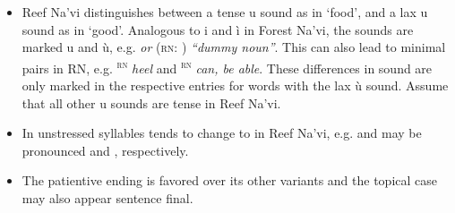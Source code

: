 \begin{itemize}
		\subitem When two ejectives across syllable boundaries get in contact within a word, they undergo regressive assimilation, e.g.  and  are \I{[ad."gE]} and \I{[Eg."du]} rather than *\I{[at'."gE]} and *\I{[Ek'."du]}.
	\item Reef Na'vi distinguishes between a tense u sound \I{[u]} as in `food', and a lax u sound \I{[U]} as in `good'. Analogous to i and ì in Forest Na'vi, the sounds are marked u and ù, e.g.  \I{[pum]} \emph{or} \I{[pUm]} (\textsc{rn:}  \I{[pUm]}) \emph{``dummy noun''}. This can also lead to minimal pairs in RN, e.g.  \I{[\t{ts}un]}\textsuperscript{\textsc{rn}} \emph{heel} and  \I{[\t{ts}Un]}\textsuperscript{\textsc{rn}} \emph{can, be able}. These differences in sound are only marked in the respective entries for words with the lax ù sound. Assume that all other u sounds are tense in Reef Na'vi.
	\item In unstressed syllables  \I{[\ae]} tends to change to  \I{[E]} in Reef Na'vi, e.g.  \I{["NE.j\ae]} and  \I{[t\ae."t'aw]} may be pronounced \I{["NE.jE]} and \I{[tE."daw]}, respectively.
	\item The patientive ending  is favored over its other variants and the topical case  may also appear sentence final. 

\end{itemize}


